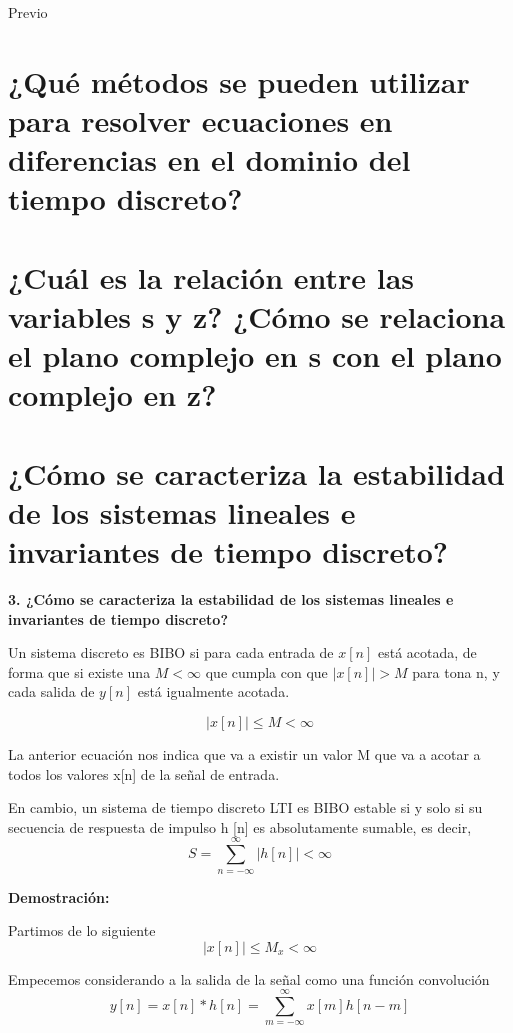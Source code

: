 {\Huge Previo }
\usepackage{mathtools}
\noindent \justifying


\section{¿Qué métodos se pueden utilizar para resolver ecuaciones en diferencias en el dominio del tiempo discreto?} 
\section{¿Cuál es la relación entre las variables s y z? ¿Cómo se relaciona el plano complejo en s con el plano complejo en z?}
\section{¿Cómo se caracteriza la estabilidad de los sistemas lineales e invariantes de tiempo discreto?}

	\noindent\textbf{3. ¿Cómo se caracteriza la estabilidad de los sistemas lineales e invariantes de tiempo discreto?}
	
	Un sistema discreto es BIBO si para cada entrada de $x[n]$ está acotada, de forma que si existe una $M<\infty$ que cumpla con que $|x[n]|>M$ para tona n, y cada salida de $y[n]$ está igualmente acotada.
	
	\begin{equation}
	|x[n]| \leq M < \infty
	\end{equation}
	
	La anterior ecuación nos indica que va a existir un valor M que va a acotar a todos los valores x[n] de la señal de entrada.
	
	En cambio, un sistema de tiempo discreto LTI es BIBO estable si y solo si su secuencia de respuesta de impulso {h [n]} es absolutamente sumable, es decir,
	\begin{equation}
		S=\sum_{n=-\infty}^{\infty}|h[n]|<\infty
	\end{equation}
	
	\noindent\textbf{Demostración:}

	Partimos de lo siguiente
	\begin{equation}
		|x[n]| \leq M_x < \infty
	\end{equation}		
	
	Empecemos considerando a la salida de la señal como una función convolución
	\begin{equation}
		y[n]=x[n]*h[n]=\sum_{m=-\infty}^{\infty}x[m]h[n-m]
	\end{equation}
	

